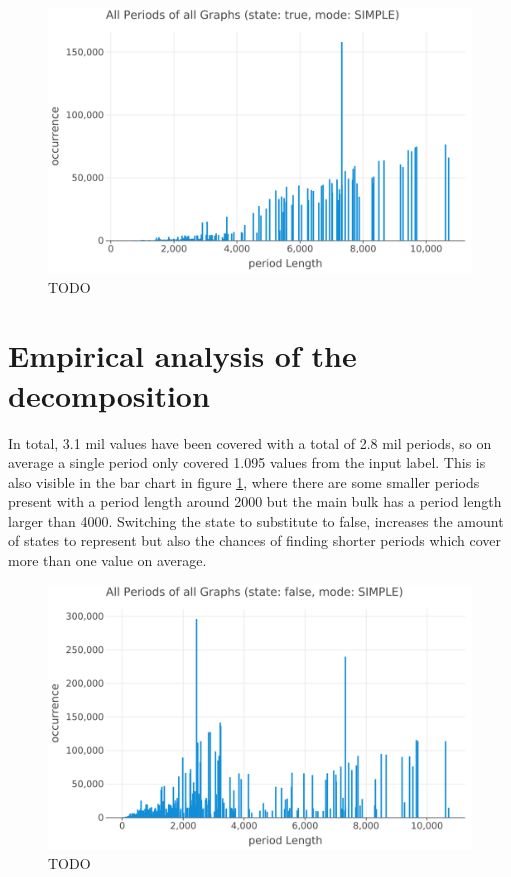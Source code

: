 \begin{figure}[h]
	\includegraphics[width=\linewidth]{charts/all-graphs-bar-char-strue-mSIMPLE.png}
	\caption{TODO}
	\label{fig:plot-all-periods-true-state}
\end{figure}

\section{Empirical analysis of the decomposition}

In total, 3.1 mil values have been covered with a total of 2.8 mil periods, so on average a single period only covered 1.095 values from the input label. This is also visible in the bar chart in figure \ref{fig:plot-all-periods-true-state}, where there are some smaller periods present with a period length around 2000 but the main bulk has a period length larger than 4000. Switching the state to substitute to false, increases the amount of states to represent but also the chances of finding shorter periods which cover more than one value on average.

\begin{figure}[h]
	\includegraphics[width=\linewidth]{charts/all-graphs-bar-char-sfalse-mSIMPLE.png}
	\caption{TODO}
	\label{fig:plot-all-periods-false-state}
\end{figure}


